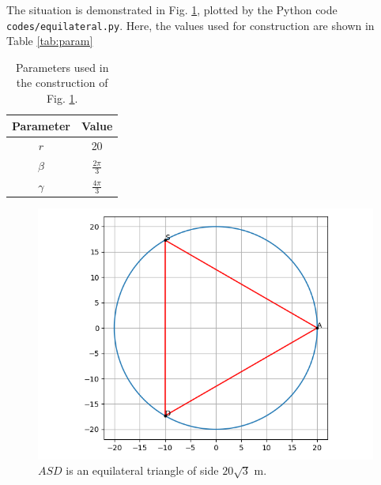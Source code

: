 \documentclass[journal,12pt,twocolumn]{IEEEtran}
\begin{document}
\begin{enumerate}
    The situation is demonstrated in Fig. \ref{fig:equilateral}, plotted by the Python
    code \texttt{codes/equilateral.py}. Here, the values used for construction are shown in Table \eqref{tab:param}
    \begin{table}[!ht]
        \centering
        \begin{tabular}{|c|c|}
            \hline
            \textbf{Parameter} & \textbf{Value} \\
            \hline
            $r$ & 20 \\
            \hline
            $\beta$ & $\frac{2\pi}{3}$ \\
            \hline
            $\gamma$ & $\frac{4\pi}{3}$ \\
            \hline
        \end{tabular}
        \caption{Parameters used in the construction of Fig. \ref{fig:equilateral}.}
        \label{tab:param}
    \end{table}
    \begin{figure}[!ht]
        \centering
        \includegraphics[width=\columnwidth]{figs/equilateral.png}
        \caption{$ASD$ is an equilateral triangle of side $20\sqrt{3}$ m.}
        \label{fig:equilateral}
    \end{figure}
\end{enumerate}
\end{document}

